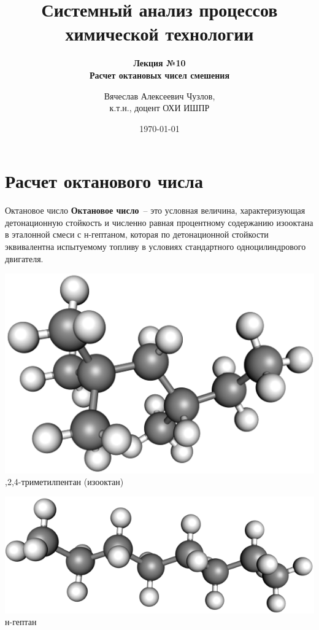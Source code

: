 \documentclass[aspectratio=169, mathserif]{beamer}%
\title{\LARGE{Системный анализ процессов химической технологии}}
\subtitle{\textcolor{tpugreen}{\textbf{Лекция №10}} \\ \textbf{Расчет октановых чисел смешения}}
\author[]{Вячеслав Алексеевич Чузлов, \\
к.т.н., доцент ОХИ ИШПР}
\date{\today}
\begin{document}

\titleframe%



\section{Расчет октанового числа}
\sectionframe

\begin{frame}[fragile, label=c]{Октановое число}
\scriptsize
\textcolor{tpugreen}{\textbf{Октановое число}}~-- это условная величина, характеризующая детонационную стойкость и численно равная процентному содержанию изооктана в эталонной смеси с н-гептаном, которая по детонационной стойкости эквивалентна испытуемому топливу в условиях стандартного одноцилиндрового двигателя.
\vfill
{}
\vfill
\begin{minipage}{.48\textwidth}
\includegraphics[width=.95\linewidth]{./pics/ic8}
,2,4-триметилпентан (изооктан)
\end{minipage}
\begin{minipage}{.01\textwidth}
\hfill
\end{minipage}
\begin{minipage}{.48\textwidth}
\includegraphics[width=\linewidth]{./pics/nc7}
\centering н-гептан
\end{minipage}
\vfill
\end{frame}
\end{document}
